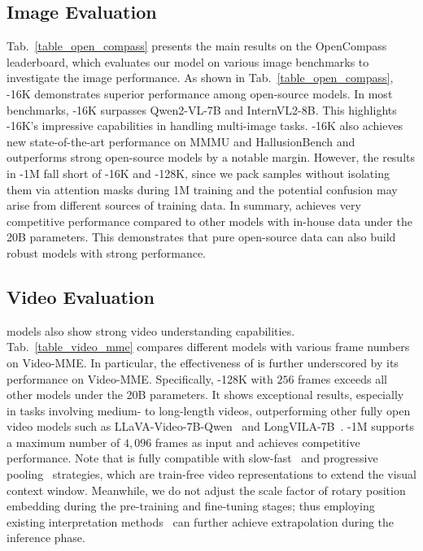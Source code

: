 \subsection{Image Evaluation}

%
Tab.~\ref{table_open_compass} presents the main results on the OpenCompass leaderboard, which evaluates our model on various image benchmarks to investigate the image performance.
%
As shown in Tab.~\ref{table_open_compass}, \OurMethod-16K demonstrates superior performance among open-source models.
%
In most benchmarks, \OurMethod-16K surpasses Qwen2-VL-7B and InternVL2-8B.
%
This highlights \OurMethod-16K’s impressive capabilities in handling multi-image tasks.
%
\OurMethod-16K also achieves new state-of-the-art performance on MMMU and HallusionBench and outperforms strong open-source models by a notable margin.
%
However, the results in \OurMethod-1M fall short of \OurMethod-16K and \OurMethod-128K, since we pack samples without isolating them via attention masks during 1M training and the potential confusion may arise from different sources of training data.
%
In summary, \OurMethod achieves very competitive performance compared to other models with in-house data under the 20B parameters.
%
This demonstrates that pure open-source data can also build robust models with strong performance.
%


\subsection{Video Evaluation}

%
\OurMethod models also show strong video understanding capabilities.
%
Tab.~\ref{table_video_mme} compares different models with various frame numbers on Video-MME.
%
In particular, the effectiveness of \OurMethod is further underscored by its performance on Video-MME.
%
Specifically, \OurMethod-128K with $256$ frames exceeds all other models under the 20B parameters.
%
It shows exceptional results, especially in tasks involving medium- to long-length videos, outperforming other fully open video models such as LLaVA-Video-7B-Qwen~\cite{LLaVA-Video} and LongVILA-7B~\cite{LongVILA}.
%
\OurMethod-1M supports a maximum number of $4,096$ frames as input and achieves competitive performance.
%
Note that \OurMethod is fully compatible with slow-fast~\cite{SF-LLaVA} and progressive pooling~\cite{progressive_pooling} strategies, which are train-free video representations to extend the visual context window.
%
Meanwhile, we do not adjust the scale factor of rotary position embedding during the pre-training and fine-tuning stages; thus employing existing interpretation methods~\cite{PositionInterpolation,YaRN} can further achieve extrapolation during the inference phase.
%

